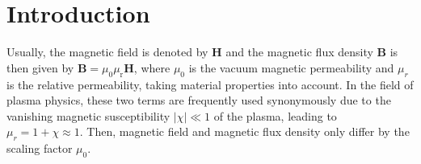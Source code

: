 \section{Introduction}
\label{sec:introduction}

Usually, the magnetic field is denoted by $\mathbf{H}$
and the magnetic flux density $\mathbf{B}$ is then given by $\mathbf{B} = \mu_0 \mu_\mathrm{r} \mathbf{H}$, where
$\mu_0$ is the vacuum magnetic permeability and $\mu_r$ is the relative permeability, taking material properties into account.
In the field of plasma physics, these two terms are frequently used synonymously due to the vanishing
magnetic susceptibility $|\chi| \ll 1$ of the plasma, leading to $\mu_r = 1+\chi \approx 1$.
Then, magnetic field and magnetic flux density only differ by the scaling factor $\mu_0$.

